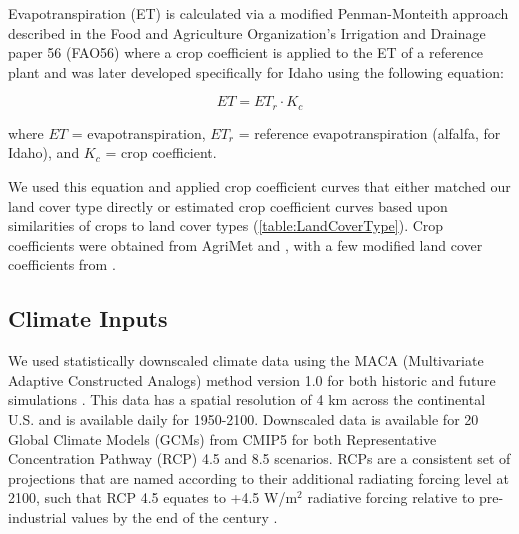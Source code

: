 \documentclass[water,article,submit,moreauthors,pdftex,10pt,a4paper]{mdpi}
\theoremstyle{mdpi}
\newcounter{re}
\theoremstyle{mdpidefinition}
\begin{document}
Evapotranspiration (ET) is calculated via a modified Penman-Monteith approach described in the Food and Agriculture Organization’s Irrigation and Drainage paper 56 (FAO56) where a crop coefficient is applied to the ET of a reference plant \citep{Allen:vn} and was later developed specifically for Idaho \citep{Allen:2007ta} using the following equation:

\begin{equation}
ET = ET_r \cdot K_c
\end{equation}

where $ET$ = evapotranspiration, $ET_r$ = reference evapotranspiration (alfalfa, for Idaho), and $K_c$ = crop coefficient.

We used this equation and applied crop coefficient curves that either matched our land cover type directly or estimated crop coefficient curves based upon similarities of crops to land cover types (\cref{table:LandCoverType}). Crop coefficients were obtained from AgriMet and \citep{Allen:2007ta}, with a few modified land cover coefficients from \citep{Inouye:2014ws}.  

\subsection{Climate Inputs}

We used statistically downscaled climate data using the MACA (Multivariate Adaptive Constructed Analogs) method version 1.0 for both historic and future simulations \citep{Abatzoglou:2011kca}. This data has a spatial resolution of 4 km across the continental U.S. and is available daily for 1950-2100. Downscaled data is available for 20 Global Climate Models (GCMs) from CMIP5 for both Representative Concentration Pathway (RCP) 4.5 and 8.5 scenarios. RCPs are a consistent set of projections that are named according to their additional radiating forcing level at 2100, such that RCP 4.5 equates to +4.5 W/m${}^2$ radiative forcing relative to pre-industrial values by the end of the century \citep{vanVuuren:2011tu}. 
\end{document}
